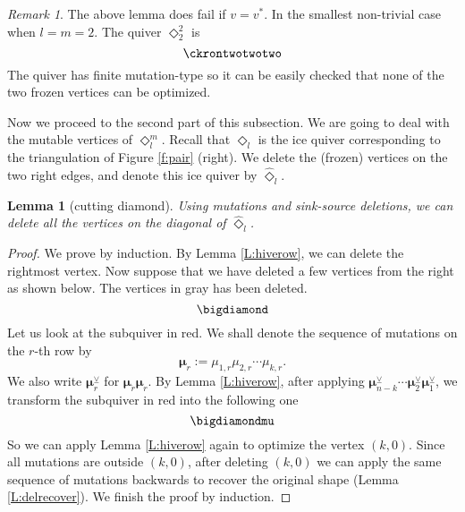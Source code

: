 \documentclass{amsart}
\newtheorem{lemma}[theorem]{Lemma}
\theoremstyle{definition}
\theoremstyle{remark}
\newtheorem{remark}[theorem]{Remark}
\numberwithin{equation}{section}
\newcommand{\bs}[1]{\boldsymbol{#1}}
\begin{document}
\begin{remark} The above lemma does fail if $v=v^*$.
In the smallest non-trivial case when $l=m=2$. The quiver $\Diamond_2^2$ is 
\begin{equation} \label{eq:d22} \ckrontwotwotwo \end{equation}
The quiver has finite mutation-type so it can be easily checked that none of the two frozen vertices can be optimized. 
\end{remark}


Now we proceed to the second part of this subsection. We are going to deal with the mutable vertices of $\Diamond_l^m$.
Recall that $\Diamond_l$ is the ice quiver corresponding to the triangulation of Figure \ref{f:pair} (right).
We delete the (frozen) vertices on the two right edges, and denote this ice quiver by $\hat{\Diamond}_l$.
\begin{lemma}[cutting diamond] \label{L:cuthalf} Using mutations and sink-source deletions, we can delete all the vertices on the diagonal of $\hat{\Diamond}_l$.
\end{lemma}

\begin{proof} We prove by induction. By Lemma \ref{L:hiverow}, we can delete the rightmost vertex.
	Now suppose that we have deleted a few vertices from the right as shown below.
	The vertices in gray has been deleted.
$$\bigdiamond$$ 
Let us look at the subquiver in red. We shall denote the sequence of mutations on the $r$-th row 
by 
$$\bs{\mu}_{r}:=\mu_{1,r}\mu_{2,r}\cdots \mu_{k,r}.$$
We also write $\bs{\mu}_r^{\veebar}$ for $\bs{\mu}_{\check{r}} \bs{\mu}_r$.
By Lemma \ref{L:hiverow}, after applying $\bs{\mu}_{n-k}^\veebar \cdots \bs{\mu}_{2}^\veebar \bs{\mu}_{1}^\veebar$,
we transform the subquiver in red into the following one 
$$\bigdiamondmu$$
So we can apply Lemma \ref{L:hiverow} again to optimize the vertex $(k,0)$.
Since all mutations are outside $(k,0)$, after deleting $(k,0)$ we can apply the same sequence of mutations backwards to recover the original shape (Lemma \ref{L:delrecover}).
We finish the proof by induction.
\end{proof}
\end{document}
